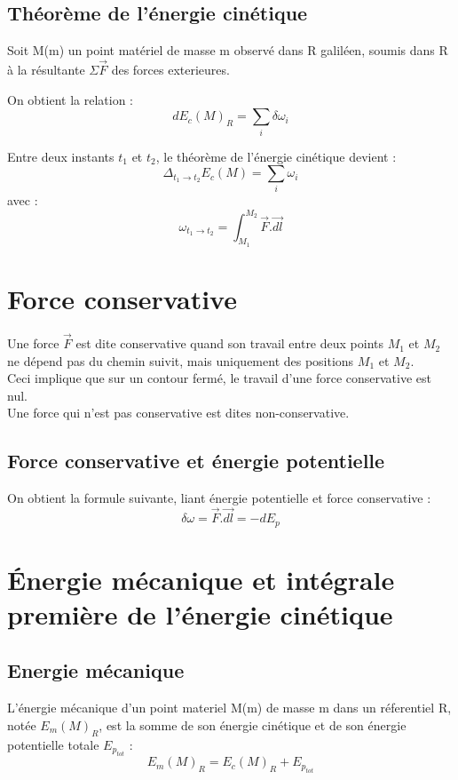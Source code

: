 \subsection{Théorème de l'énergie cinétique}
Soit M(m) un point matériel de masse m observé dans R galiléen, soumis dans R à la résultante $\Sigma \overrightarrow{F}$ des forces exterieures.\\
\begin{theo}
On obtient la relation :
$$dE_c(M)_R = \sum_i \delta\omega_i$$
\end{theo}
Entre deux instants $t_1$ et $t_2$, le théorème de l'énergie cinétique devient :
$$\Delta_{t_1 \rightarrow t_2} E_c(M) = \sum_i \omega_i$$
avec :
$$\omega_{t_1 \rightarrow t_2} = \int_{M_1}^{M_2} \overrightarrow{F}.\overrightarrow{dl}$$
\section{Force conservative}
\begin{de}
Une force $\overrightarrow{F}$ est dite conservative quand son travail entre deux points $M_1$ et $M_2$ ne dépend pas du chemin suivit, mais uniquement des positions $M_1$ et $M_2$.\\
Ceci implique que sur un contour fermé, le travail d'une force conservative est nul.\\
Une force qui n'est pas conservative est dites non-conservative.
\end{de}
\subsection{Force conservative et énergie potentielle}
On obtient la formule suivante, liant énergie potentielle et force conservative : 
$$\delta \omega = \overrightarrow{F}.\overrightarrow{dl}=-dE_p$$
\section{\'Energie mécanique et intégrale première de l'énergie cinétique}
\subsection{Energie mécanique}
\begin{de}
L'énergie mécanique d'un point materiel M(m) de masse m dans un réferentiel R, notée $E_m(M)_R$, est la somme de son énergie cinétique et de son énergie potentielle totale $E_{p_{tot}}$ :
$$E_m(M)_R = E_c(M)_R + E_{p_{tot}}$$
\end{de}
